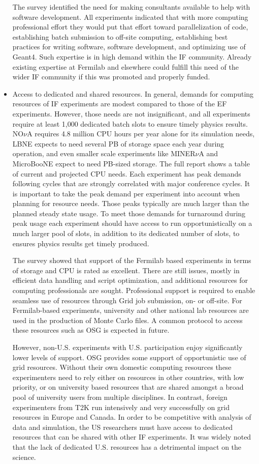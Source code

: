 \begin{itemize}
The survey identified the need for making consultants available to help with
software development. All experiments indicated that with more computing
professional effort they would put that effort toward parallelization of code,
establishing batch submission to off-site computing, establishing best
practices for writing software, software development, and  optimizing use of
Geant4. Such expertise is in high demand within the IF community. Already
existing expertise at Fermilab and elsewhere could fulfill this need of the
wider IF community if this was promoted and properly funded.

\item Access to dedicated and shared resources.  In general, demands for
computing resources of IF experiments are modest compared to those of the EF
experiments.  However, those needs are not insignificant, and all experiments
require at least 1,000 dedicated batch slots to ensure timely physics results. 
NO$\nu$A requires 4.8 million
CPU hours per year alone for its simulation needs, LBNE expects to need
several PB of storage space each year during operation, and even smaller scale
experiments like MINER$\nu$A and MicroBooNE expect to need PB-sized storage.
The full report shows a table of current and projected CPU needs. Each
experiment has peak demands following cycles that are strongly correlated with
major conference cycles.  It is important to take the peak demand per
experiment into account when planning for resource needs. Those peaks
typically are much larger than the planned steady state usage. To meet those
demands for turnaround during peak usage each experiment should have access to
run opportunistically on a much larger pool of slots, in addition to its
dedicated number of slots, to ensures physics results get timely produced.

The survey showed that support of the Fermilab based experiments in terms of
storage and CPU is rated as excellent.  There are still issues, mostly in
efficient data handling and script optimization, and additional resources for
computing professionals are sought.  Professional support is required to
enable seamless use of resources through Grid job submission, on- or off-site.
For Fermilab-based experiments, university and other national lab resources
are used in the production of Monte Carlo files. A common protocol to access
these resources such as OSG is expected in future.

However, non-U.S. experiments with U.S. participation enjoy significantly
lower levels of support. OSG provides some support of opportunistic use of
grid resources.  Without their own domestic computing resources these
experimenters need to rely either on resources in other countries, with low
priority, or on university based resources that are shared amongst a broad
pool of university users from multiple disciplines. In contrast, foreign experimenters
from T2K run intensively and very successfully on grid resources in Europe and
Canada.  In order to be competitive with analysis of data and simulation, the US 
researchers must have access to dedicated resources that can
be shared with other IF experiments. It was widely noted that the lack of dedicated U.S.
resources has a detrimental impact on the science.


\end{itemize}
